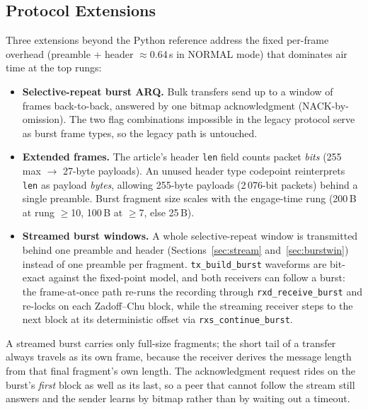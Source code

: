 \subsection{Protocol Extensions}
\label{sec:cport_proto}

Three extensions beyond the Python reference address the fixed
per-frame overhead (preamble + header $\approx$0.64\,s in NORMAL mode)
that dominates air time at the top rungs:

\begin{itemize}
    \item \textbf{Selective-repeat burst ARQ.}  Bulk transfers send up
          to a window of frames back-to-back, answered by one bitmap
          acknowledgment (NACK-by-omission).  The two flag combinations
          impossible in the legacy protocol serve as burst frame types,
          so the legacy path is untouched.
    \item \textbf{Extended frames.}  The article's header \texttt{len}
          field counts packet \emph{bits} (255 max
          $\rightarrow$ 27-byte payloads).  An unused header type
          codepoint reinterprets \texttt{len} as payload \emph{bytes},
          allowing 255-byte payloads (2\,076-bit packets) behind a
          single preamble.  Burst fragment size scales with the
          engage-time rung (200\,B at rung $\ge$10, 100\,B at $\ge$7,
          else 25\,B).
    \item \textbf{Streamed burst windows.}  A whole selective-repeat
          window is transmitted behind one preamble and header
          (Sections~\ref{sec:stream} and~\ref{sec:burstwin}) instead
          of one preamble per fragment.  \texttt{tx\_build\_burst}
          waveforms are bit-exact against the fixed-point model, and
          both receivers can follow a burst: the frame-at-once path
          re-runs the recording through \texttt{rxd\_receive\_burst}
          and re-locks on each Zadoff--Chu block, while the streaming
          receiver steps to the next block at its deterministic offset
          via \texttt{rxs\_continue\_burst}.
\end{itemize}

A streamed burst carries only full-size fragments; the short tail of a
transfer always travels as its own frame, because the receiver derives
the message length from that final fragment's own length.  The
acknowledgment request rides on the burst's \emph{first} block as well
as its last, so a peer that cannot follow the stream still answers and
the sender learns by bitmap rather than by waiting out a timeout.

